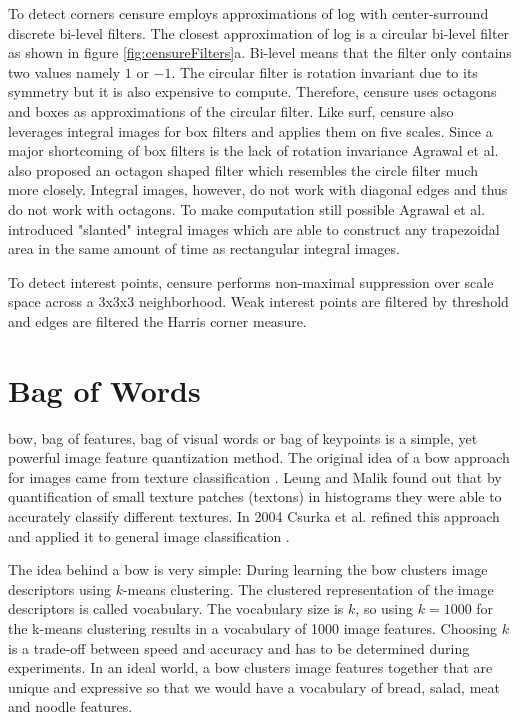 To detect corners \gls{censure} employs approximations of \gls{log} with center-surround discrete bi-level filters. The closest approximation of \gls{log} is a circular bi-level filter as shown in figure \ref{fig:censureFilters}a. Bi-level means that the filter only contains two values namely $1$ or $-1$. The circular filter is rotation invariant due to its symmetry but it is also expensive to compute. Therefore, \gls{censure} uses octagons and boxes as approximations of the circular filter. Like \gls{surf}, \gls{censure} also leverages integral images for box filters and applies them on five scales. Since a major shortcoming of box filters is the lack of rotation invariance Agrawal et al. also proposed an octagon shaped filter which resembles the circle filter much more closely. Integral images, however, do not work with diagonal edges and thus do not work with octagons. To make computation still possible Agrawal et al. introduced "slanted" integral images which are able to construct any trapezoidal area in the same amount of time as rectangular integral images. 

To detect interest points, \gls{censure} performs non-maximal suppression over scale space across a 3x3x3 neighborhood. Weak interest points are filtered by threshold and edges are filtered the Harris corner measure.

\section{Bag of Words}
\acrfull{bow}, bag of features, bag of visual words or bag of keypoints is a simple, yet powerful image feature quantization method. The original idea of a \gls{bow} approach for images came from texture classification \cite{Leung2001}. Leung and Malik found out that by quantification of small texture patches {(textons)} in histograms they were able to accurately classify different textures. In 2004 Csurka et al. refined this approach and applied it to general image classification \cite{Csurka2004}.

The idea behind a \gls{bow} is very simple: During learning the \gls{bow} clusters image descriptors using $k$-means clustering. The clustered representation of the image descriptors is called vocabulary. The vocabulary size is $k$, so using $k=1000$ for the k-means clustering results in a vocabulary of 1000 image features. Choosing $k$ is a trade-off between speed and accuracy and has to be determined during experiments. In an ideal world, a \gls{bow} clusters image features together that are unique and expressive so that we would have a vocabulary of bread, salad, meat and noodle features.

